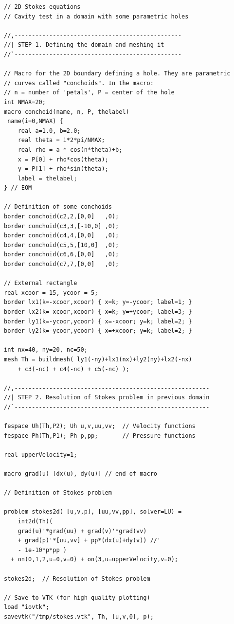 \documentclass[12pt]{article}
\begin{document}
\lstset{language=freefem++}
\begin{lstlisting}
// 2D Stokes equations
// Cavity test in a domain with some parametric holes

//,------------------------------------------------
//| STEP 1. Defining the domain and meshing it
//`------------------------------------------------

// Macro for the 2D boundary defining a hole. They are parametric
// curves called "conchoids". In the macro:
// n = number of 'petals', P = center of the hole
int NMAX=20;
macro conchoid(name, n, P, thelabel)
 name(i=0,NMAX) {
    real a=1.0, b=2.0;
    real theta = i*2*pi/NMAX;
    real rho = a * cos(n*theta)+b;
    x = P[0] + rho*cos(theta);
    y = P[1] + rho*sin(theta);
    label = thelabel;
} // EOM

// Definition of some conchoids
border conchoid(c2,2,[0,0]   ,0);
border conchoid(c3,3,[-10,0] ,0);
border conchoid(c4,4,[0,0]   ,0);
border conchoid(c5,5,[10,0]  ,0);
border conchoid(c6,6,[0,0]   ,0);
border conchoid(c7,7,[0,0]   ,0);

// External rectangle
real xcoor = 15, ycoor = 5;
border lx1(k=-xcoor,xcoor) { x=k; y=-ycoor; label=1; }
border lx2(k=-xcoor,xcoor) { x=k; y=+ycoor; label=3; }
border ly1(k=-ycoor,ycoor) { x=-xcoor; y=k; label=2; }
border ly2(k=-ycoor,ycoor) { x=+xcoor; y=k; label=2; }

int nx=40, ny=20, nc=50;
mesh Th = buildmesh( ly1(-ny)+lx1(nx)+ly2(ny)+lx2(-nx)
    + c3(-nc) + c4(-nc) + c5(-nc) );

//,--------------------------------------------------------
//| STEP 2. Resolution of Stokes problem in previous domain
//`--------------------------------------------------------

fespace Uh(Th,P2); Uh u,v,uu,vv;  // Velocity functions
fespace Ph(Th,P1); Ph p,pp;       // Pressure functions

real upperVelocity=1;

macro grad(u) [dx(u), dy(u)] // end of macro

// Definition of Stokes problem

problem stokes2d( [u,v,p], [uu,vv,pp], solver=LU) =
    int2d(Th)(
	grad(u)'*grad(uu) + grad(v)'*grad(vv)
	+ grad(p)'*[uu,vv] + pp*(dx(u)+dy(v)) //'
	- 1e-10*p*pp )
  + on(0,1,2,u=0,v=0) + on(3,u=upperVelocity,v=0);

stokes2d;  // Resolution of Stokes problem

// Save to VTK (for high quality plotting)
load "iovtk";
savevtk("/tmp/stokes.vtk", Th, [u,v,0], p);
\end{lstlisting}
\end{document}

